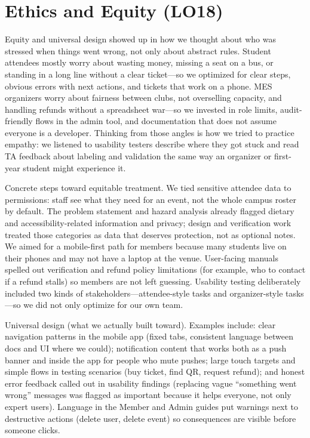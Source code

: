 \documentclass{article}
\begin{document}
\section{Ethics and Equity (LO18)}

Equity and universal design showed up in how we thought about who was
stressed when things went wrong, not only about abstract rules. Student
attendees mostly worry about wasting money, missing a seat on a bus, or standing
in a long line without a clear ticket---so we optimized for clear steps,
obvious errors with next actions, and tickets that work on a
phone. MES organizers worry about fairness between clubs, not overselling
capacity, and handling refunds without a spreadsheet war---so we invested in role
limits, audit-friendly flows in the admin tool, and documentation that does not
assume everyone is a developer. Thinking from those angles is how we tried to
practice empathy: we listened to usability testers describe where they got stuck
and read TA feedback about labeling and validation the same way an organizer or
first-year student might experience it.

Concrete steps toward equitable treatment. We tied sensitive attendee
data to permissions: staff see what they need for an event, not the
whole campus roster by default. The problem statement and hazard analysis already
flagged dietary and accessibility-related information and
privacy; design and verification work treated those categories as data
that deserves protection, not as optional notes. We aimed for a mobile-first
path for members because many students live on their phones and may not have a
laptop at the venue. User-facing manuals spelled out verification and
refund policy limitations (for example, who to contact if a refund stalls) so
members are not left guessing. Usability testing deliberately included
two kinds of stakeholders---attendee-style tasks and organizer-style
tasks---so we did not only optimize for our own team.

Universal design (what we actually built toward). Examples include:
clear navigation patterns in the mobile app (fixed tabs, consistent
language between docs and UI where we could); notification content that
works both as a push banner and inside the app for people who mute pushes;
large touch targets and simple flows in testing scenarios (buy ticket,
find QR, request refund); and honest error feedback called out in
usability findings (replacing vague ``something went wrong'' messages was flagged
as important because it helps everyone, not only expert users). Language in the
Member and Admin guides put warnings next to destructive actions (delete
user, delete event) so consequences are visible before someone clicks.
\end{document}
